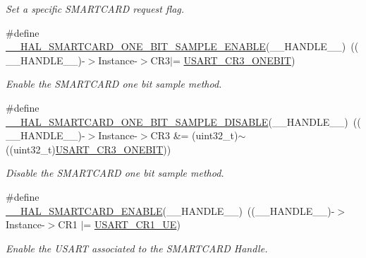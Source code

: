 \begin{DoxyCompactItemize}
\begin{DoxyCompactList}\small\item\em Set a specific S\+M\+A\+R\+T\+C\+A\+RD request flag. \end{DoxyCompactList}\item 
\#define \hyperlink{group___s_m_a_r_t_c_a_r_d___exported___macros_ga6b4e136b15d772d901351369df7a4dda}{\+\_\+\+\_\+\+H\+A\+L\+\_\+\+S\+M\+A\+R\+T\+C\+A\+R\+D\+\_\+\+O\+N\+E\+\_\+\+B\+I\+T\+\_\+\+S\+A\+M\+P\+L\+E\+\_\+\+E\+N\+A\+B\+LE}(\+\_\+\+\_\+\+H\+A\+N\+D\+L\+E\+\_\+\+\_\+)~((\+\_\+\+\_\+\+H\+A\+N\+D\+L\+E\+\_\+\+\_\+)-\/$>$Instance-\/$>$C\+R3$\vert$= \hyperlink{group___peripheral___registers___bits___definition_ga9a96fb1a7beab602cbc8cb0393593826}{U\+S\+A\+R\+T\+\_\+\+C\+R3\+\_\+\+O\+N\+E\+B\+IT})
\begin{DoxyCompactList}\small\item\em Enable the S\+M\+A\+R\+T\+C\+A\+RD one bit sample method. \end{DoxyCompactList}\item 
\#define \hyperlink{group___s_m_a_r_t_c_a_r_d___exported___macros_ga82594558a0ec7710672d530161d1c761}{\+\_\+\+\_\+\+H\+A\+L\+\_\+\+S\+M\+A\+R\+T\+C\+A\+R\+D\+\_\+\+O\+N\+E\+\_\+\+B\+I\+T\+\_\+\+S\+A\+M\+P\+L\+E\+\_\+\+D\+I\+S\+A\+B\+LE}(\+\_\+\+\_\+\+H\+A\+N\+D\+L\+E\+\_\+\+\_\+)~((\+\_\+\+\_\+\+H\+A\+N\+D\+L\+E\+\_\+\+\_\+)-\/$>$Instance-\/$>$C\+R3 \&= (uint32\+\_\+t)$\sim$((uint32\+\_\+t)\hyperlink{group___peripheral___registers___bits___definition_ga9a96fb1a7beab602cbc8cb0393593826}{U\+S\+A\+R\+T\+\_\+\+C\+R3\+\_\+\+O\+N\+E\+B\+IT}))
\begin{DoxyCompactList}\small\item\em Disable the S\+M\+A\+R\+T\+C\+A\+RD one bit sample method. \end{DoxyCompactList}\item 
\#define \hyperlink{group___s_m_a_r_t_c_a_r_d___exported___macros_gac739764f1f7326689516931771d60742}{\+\_\+\+\_\+\+H\+A\+L\+\_\+\+S\+M\+A\+R\+T\+C\+A\+R\+D\+\_\+\+E\+N\+A\+B\+LE}(\+\_\+\+\_\+\+H\+A\+N\+D\+L\+E\+\_\+\+\_\+)~((\+\_\+\+\_\+\+H\+A\+N\+D\+L\+E\+\_\+\+\_\+)-\/$>$Instance-\/$>$C\+R1 $\vert$=  \hyperlink{group___peripheral___registers___bits___definition_ga2bb650676aaae4a5203f372d497d5947}{U\+S\+A\+R\+T\+\_\+\+C\+R1\+\_\+\+UE})
\begin{DoxyCompactList}\small\item\em Enable the U\+S\+A\+RT associated to the S\+M\+A\+R\+T\+C\+A\+RD Handle. \end{DoxyCompactList}\item 

\end{DoxyCompactItemize}
